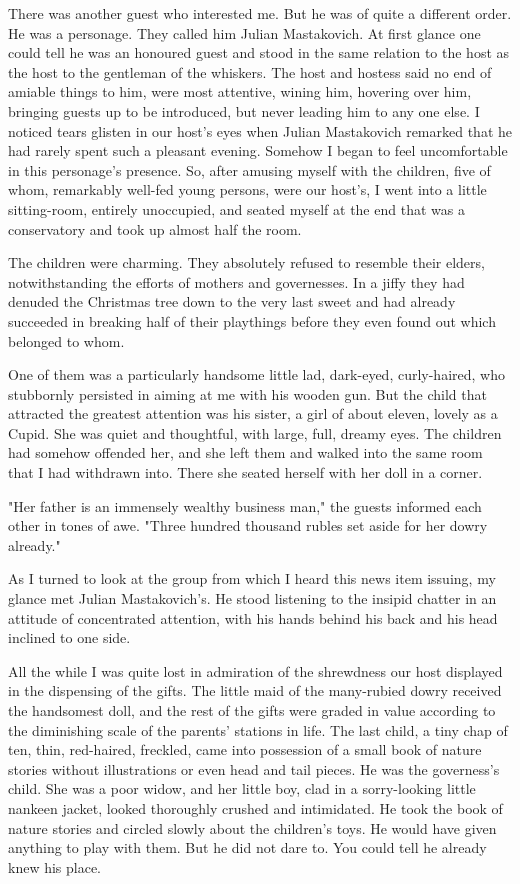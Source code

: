 There was another guest who interested me. But he was of quite a
different order. He was a personage. They called him Julian
Mastakovich. At first glance one could tell he was an honoured guest
and stood in the same relation to the host as the host to the
gentleman of the whiskers. The host and hostess said no end of amiable
things to him, were most attentive, wining him, hovering over him,
bringing guests up to be introduced, but never leading him to any one
else. I noticed tears glisten in our host's eyes when Julian
Mastakovich remarked that he had rarely spent such a pleasant evening.
Somehow I began to feel uncomfortable in this personage's presence.
So, after amusing myself with the children, five of whom, remarkably
well-fed young persons, were our host's, I went into a little
sitting-room, entirely unoccupied, and seated myself at the end that
was a conservatory and took up almost half the room.

The children were charming. They absolutely refused to resemble their
elders, notwithstanding the efforts of mothers and governesses. In a
jiffy they had denuded the Christmas tree down to the very last sweet
and had already succeeded in breaking half of their playthings before
they even found out which belonged to whom.

One of them was a particularly handsome little lad, dark-eyed,
curly-haired, who stubbornly persisted in aiming at me with his wooden
gun. But the child that attracted the greatest attention was his
sister, a girl of about eleven, lovely as a Cupid. She was quiet and
thoughtful, with large, full, dreamy eyes. The children had somehow
offended her, and she left them and walked into the same room that I
had withdrawn into. There she seated herself with her doll in a
corner.

"Her father is an immensely wealthy business man," the guests informed
each other in tones of awe. "Three hundred thousand rubles set aside
for her dowry already."

As I turned to look at the group from which I heard this news item
issuing, my glance met Julian Mastakovich's. He stood listening to the
insipid chatter in an attitude of concentrated attention, with his
hands behind his back and his head inclined to one side.

All the while I was quite lost in admiration of the shrewdness our
host displayed in the dispensing of the gifts. The little maid of the
many-rubied dowry received the handsomest doll, and the rest of the
gifts were graded in value according to the diminishing scale of the
parents' stations in life. The last child, a tiny chap of ten, thin,
red-haired, freckled, came into possession of a small book of nature
stories without illustrations or even head and tail pieces. He was the
governess's child. She was a poor widow, and her little boy, clad in a
sorry-looking little nankeen jacket, looked thoroughly crushed and
intimidated. He took the book of nature stories and circled slowly
about the children's toys. He would have given anything to play with
them. But he did not dare to. You could tell he already knew his
place.

